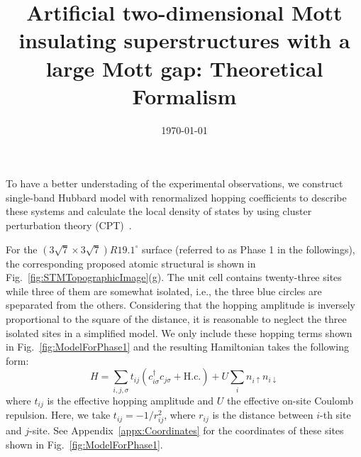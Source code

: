 \documentclass[aps,prb,reprint,amsfonts,amsmath,amssymb,showpacs,groupedaddress,superscriptaddress,onecolumn]{revtex4-1}
\begin{document}
\title{Artificial two-dimensional Mott insulating superstructures with a large Mott gap: Theoretical Formalism}

\date{\today}

\maketitle

To have a better understading of the experimental observations, we construct single-band Hubbard model with renormalized hopping coefficients to describe these systems and calculate the local density of states by using cluster perturbation theory (CPT)~\cite{PhysRevB.48.418,PhysRevLett.84.522}.

For the $(3\sqrt{7} \times 3\sqrt{7})R19.1^\circ$ surface (referred to as Phase 1 in the followings), the corresponding proposed atomic structural is shown in Fig.~\ref{fig:STMTopographicImage}(g). The unit cell contains twenty-three sites while three of them are somewhat isolated, i.e., the three blue circles are speparated from the others. Considering that the hopping amplitude is inversely proportional to the square of the distance, it is reasonable to neglect the three isolated sites in a simplified model. We only include these hopping terms shown in Fig.~\ref{fig:ModelForPhase1} and the resulting Hamiltonian takes the following form:
\begin{equation}
    H = \sum_{i,j,\sigma} t_{ij}(c_{i\sigma}^{\dagger}c_{j\sigma} + \text{H.c.}) + U \sum_{i} n_{i\uparrow} n_{i\downarrow}
    \label{eq:ModelHamiltonian}
\end{equation}
where $t_{ij}$ is the effective hopping amplitude and $U$ the effective on-site Coulomb repulsion. Here, we take $t_{ij} = -1/r_{ij}^{2}$, where $r_{ij}$ is the distance between $i$-th site and $j$-site. See Appendix~\ref{appx:Coordinates} for the coordinates of these sites shown in Fig.~\ref{fig:ModelForPhase1}.
\end{document}
